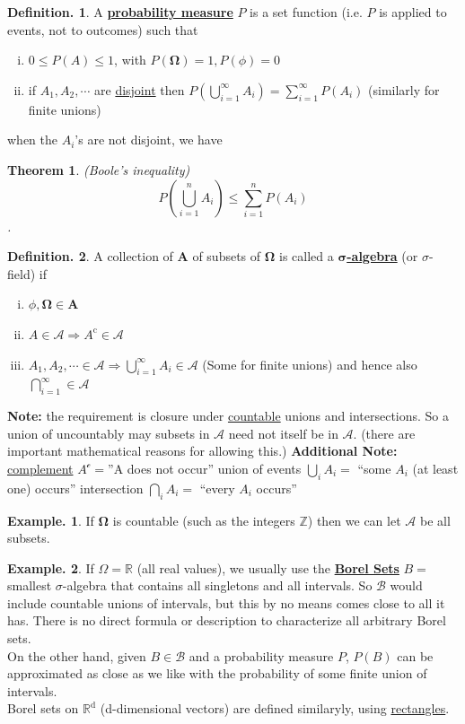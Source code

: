 \documentclass[12pt]{article}
\theoremstyle{definition}
\newtheorem{mydef}{Definition.}[section]
\newtheorem{myexp}{Example.}[section]
\theoremstyle{plain}
\newtheorem{mythm}{Theorem}[section]
\begin{document}
\begin{mydef}
A \underline{\textbf{probability measure}} $P$ is a set function (i.e. $P$ is applied to events, not to outcomes) such that
\begin{enumerate}[(i)]
\item $0 \leq P(A) \leq 1$, with $P(\mathbf{\Omega}) = 1, P(\phi) = 0$
\item if $A_1, A_2, \cdots$ are \underline{disjoint} then $P(\bigcup_{i=1}^\infty A_i) = \sum_{i=1}^\infty P(A_i)$ (similarly for finite unions) 
\end{enumerate}
\end{mydef}
when the $A_i$'s are not disjoint, we have
\begin{mythm}
(Boole's inequality) \[P(\bigcup_{i=1}^n A_i) \leq \sum_{i=1}^n P(A_i)\].
\end{mythm}

\begin{mydef}
A collection of $\mathbf{A}$ of subsets of $\mathbf{\Omega}$ is called a \underline{$\mathbf{\sigma}$\textbf{-algebra}} (or $\sigma$-field) if 
\begin{enumerate}[(i)]
\item $\phi, \mathbf{\Omega} \in \mathbf{A}$
\item $A \in \mathcal{A} \Longrightarrow   A^{\mathrm{c}} \in \mathcal{A}$
\item $A_1, A_2, \cdots \in \mathcal{A} \Longrightarrow \bigcup_{i=1}^\infty A_i \in \mathcal{A}$  (Some for finite unions) and hence also $\bigcap_{i=1}^\infty \in \mathcal{A}$ 
\end{enumerate}
\end{mydef}
\textbf{Note:} the requirement is closure under \underline{countable} unions and intersections. So a union of uncountably may subsets in $\mathcal{A}$ need not itself be in $\mathcal{A}$. (there are important mathematical reasons for allowing this.)
\textbf{Additional Note:} \underline{complement} $A^\mathcal{c}=$''A does not occur''
union of events $\bigcup_i A_i = $ ``some $A_i$ (at least one) occurs''
intersection $\bigcap_i A_i=$ ``every $A_i$ occurs'' 

\begin{myexp}
If $\mathbf{\Omega}$ is countable (such as the integers $\mathbb{Z}$) then we can let $\mathcal{A}$ be all subsets.
\end{myexp}
\begin{myexp}
If $\Omega = \mathbb{R}$ (all real values), we usually use the \underline{\textbf{Borel Sets}} $B=$ smallest $\sigma$-algebra that contains all singletons and all intervals. So $\mathcal{B}$ would include countable unions of intervals, but this by no means comes close to all it has. There is no direct formula or description to characterize all arbitrary Borel sets.\\
On the other hand, given $B \in \mathcal{B}$ and a probability measure $P$, $P(B)$ can be approximated as close as we like with the probability of some finite union of intervals.
\\ 
Borel sets on $\mathbb{R}^\mathrm{d}$ (d-dimensional vectors) are defined similaryly, using \underline{rectangles}.
\end{myexp}
\end{document}
